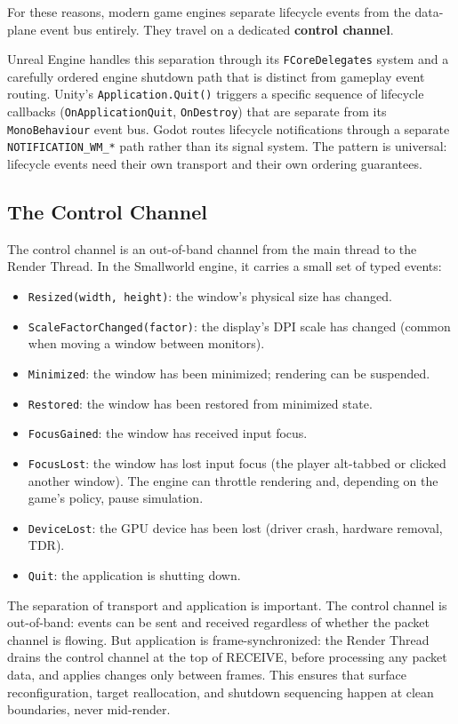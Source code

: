 \documentclass[
  11pt,
  letterpaper,
  DIV=11,
  numbers=noendperiod,
  twoside,
  open=right]{scrreprt}
\providecommand{\tightlist}{%
  \setlength{\itemsep}{0pt}\setlength{\parskip}{0pt}}
\begin{document}
For these reasons, modern game engines separate lifecycle events from
the data-plane event bus entirely. They travel on a dedicated
\textbf{control channel}.

Unreal Engine handles this separation through its
\texttt{FCoreDelegates} system and a carefully ordered engine shutdown
path that is distinct from gameplay event routing. Unity's
\texttt{Application.Quit()} triggers a specific sequence of lifecycle
callbacks (\texttt{OnApplicationQuit}, \texttt{OnDestroy}) that are
separate from its \texttt{MonoBehaviour} event bus. Godot routes
lifecycle notifications through a separate \texttt{NOTIFICATION\_WM\_*}
path rather than its signal system. The pattern is universal: lifecycle
events need their own transport and their own ordering guarantees.

\subsection{The Control Channel}\label{the-control-channel}

The control channel is an out-of-band channel from the main thread to
the Render Thread. In the Smallworld engine, it carries a small set of
typed events:

\begin{itemize}
\tightlist
\item
  \texttt{Resized(width,\ height)}: the window's physical size has
  changed.
\item
  \texttt{ScaleFactorChanged(factor)}: the display's DPI scale has
  changed (common when moving a window between monitors).
\item
  \texttt{Minimized}: the window has been minimized; rendering can be
  suspended.
\item
  \texttt{Restored}: the window has been restored from minimized state.
\item
  \texttt{FocusGained}: the window has received input focus.
\item
  \texttt{FocusLost}: the window has lost input focus (the player
  alt-tabbed or clicked another window). The engine can throttle
  rendering and, depending on the game's policy, pause simulation.
\item
  \texttt{DeviceLost}: the GPU device has been lost (driver crash,
  hardware removal, TDR).
\item
  \texttt{Quit}: the application is shutting down.
\end{itemize}

The separation of transport and application is important. The control
channel is out-of-band: events can be sent and received regardless of
whether the packet channel is flowing. But application is
frame-synchronized: the Render Thread drains the control channel at the
top of RECEIVE, before processing any packet data, and applies changes
only between frames. This ensures that surface reconfiguration, target
reallocation, and shutdown sequencing happen at clean boundaries, never
mid-render.
\end{document}
